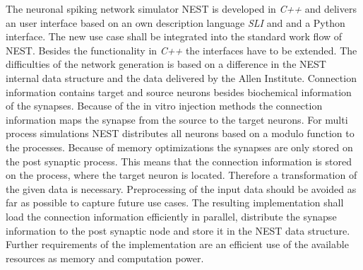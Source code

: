 \documentclass[a4paper]{article}
\begin{document}
The neuronal spiking network simulator NEST is developed in \emph{C++} and delivers
an user interface based on an own description language \emph{SLI} and  and a Python interface.
The new use case shall be integrated into the standard work flow of NEST.
Besides the functionality in \emph{C++} the interfaces have to be extended.
The difficulties of the network generation is based on a difference in 
the NEST internal data structure and the data delivered by the Allen Institute.
Connection information contains target and source neurons besides biochemical
information of the synapses. Because of the in vitro injection methods the
connection information maps the synapse from the source to the target neurons.
For multi process simulations NEST distributes all neurons based on a modulo function 
to the processes. Because of memory optimizations the synapses are only stored on the
post synaptic process. This means that the connection information is stored
on the process, where the target neuron is located. Therefore a transformation of the given data is
necessary. Preprocessing of the input data should be avoided as far as possible to capture
future use cases.
The resulting implementation shall load the connection information efficiently in parallel,
distribute the synapse information to the post synaptic node and store it in
the NEST data structure.
Further requirements of the implementation are an efficient use of the available resources as
memory and computation power. 
\end{document}
